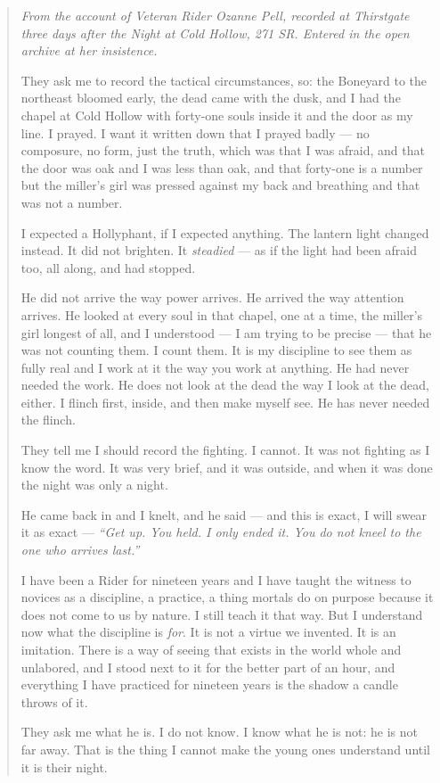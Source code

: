 \begin{quote}
\small
\textit{From the account of Veteran Rider Ozanne Pell, recorded at Thirstgate three days after the Night at Cold Hollow, 271 SR. Entered in the open archive at her insistence.}

\medskip

They ask me to record the tactical circumstances, so: the Boneyard to the northeast bloomed early, the dead came with the dusk, and I had the chapel at Cold Hollow with forty-one souls inside it and the door as my line. I prayed. I want it written down that I prayed badly --- no composure, no form, just the truth, which was that I was afraid, and that the door was oak and I was less than oak, and that forty-one is a number but the miller's girl was pressed against my back and breathing and that was not a number.

I expected a Hollyphant, if I expected anything. The lantern light changed instead. It did not brighten. It \textit{steadied} --- as if the light had been afraid too, all along, and had stopped.

He did not arrive the way power arrives. He arrived the way attention arrives. He looked at every soul in that chapel, one at a time, the miller's girl longest of all, and I understood --- I am trying to be precise --- that he was not counting them. I count them. It is my discipline to see them as fully real and I work at it the way you work at anything. He had never needed the work. He does not look at the dead the way I look at the dead, either. I flinch first, inside, and then make myself see. He has never needed the flinch.

They tell me I should record the fighting. I cannot. It was not fighting as I know the word. It was very brief, and it was outside, and when it was done the night was only a night.

He came back in and I knelt, and he said --- and this is exact, I will swear it as exact --- \textit{``Get up. You held. I only ended it. You do not kneel to the one who arrives last.''}

I have been a Rider for nineteen years and I have taught the witness to novices as a discipline, a practice, a thing mortals do on purpose because it does not come to us by nature. I still teach it that way. But I understand now what the discipline is \textit{for}. It is not a virtue we invented. It is an imitation. There is a way of seeing that exists in the world whole and unlabored, and I stood next to it for the better part of an hour, and everything I have practiced for nineteen years is the shadow a candle throws of it.

They ask me what he is. I do not know. I know what he is not: he is not far away. That is the thing I cannot make the young ones understand until it is their night.
\end{quote}

